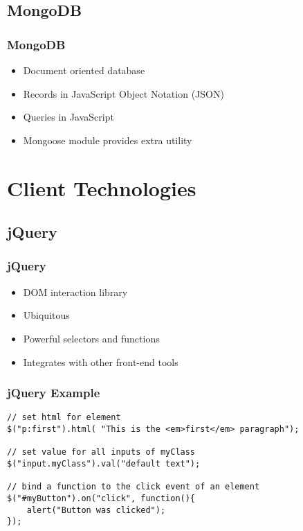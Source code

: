 \documentclass{beamer}
\begin{document}
\subsection{MongoDB}
\begin{frame}[fragile]
\frametitle{MongoDB}
	\begin{itemize}
  	 \item Document oriented database
         \item Records in JavaScript Object Notation (JSON)
  	 \item Queries in JavaScript
  	 \item Mongoose module provides extra utility
	\end{itemize}
\end{frame}


\section{Client Technologies}
\subsection{jQuery}
\begin{frame}[fragile]
\frametitle{jQuery}
	\begin{itemize}
  	 \item DOM interaction library
  	 \item Ubiquitous
  	 \item Powerful selectors and functions
	 \item Integrates with other front-end tools
	\end{itemize}
\end{frame}

\begin{frame}[fragile]
\frametitle{jQuery Example}
\begingroup
\fontsize{8pt}{12pt}\selectfont
\begin{verbatim}
// set html for element
$("p:first").html( "This is the <em>first</em> paragraph");

// set value for all inputs of myClass
$("input.myClass").val("default text");

// bind a function to the click event of an element
$("#myButton").on("click", function(){
    alert("Button was clicked");
});
\end{verbatim}
\endgroup
\end{frame}
\end{document}
